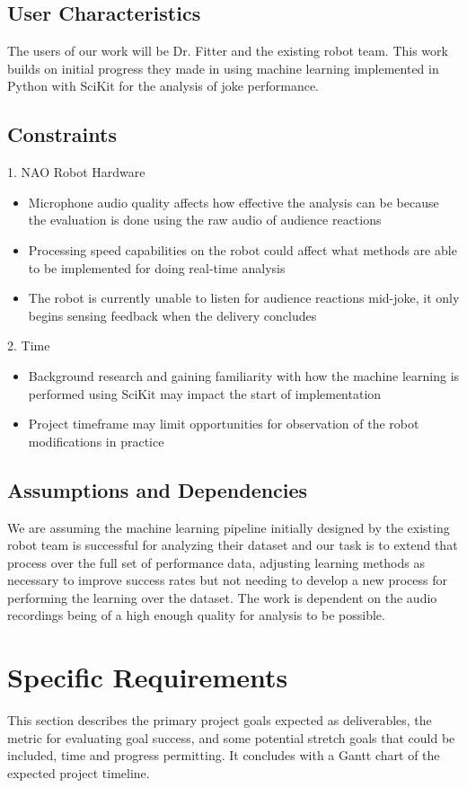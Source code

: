 \documentclass[onecolumn, draftclsnofoot,10pt, compsoc]{IEEEtran}
\begin{document}
\subsection{User Characteristics}
The users of our work will be Dr. Fitter and the existing robot team. This work builds on initial progress they made in using machine learning implemented in Python with SciKit for the analysis of joke performance.
\subsection{Constraints}
1. NAO Robot Hardware
\begin{itemize}	
\item Microphone audio quality affects how effective the analysis can be because the evaluation is done using the raw audio of audience reactions
\item Processing speed capabilities on the robot could affect what methods are able to be implemented for doing real-time analysis
\item The robot is currently unable to listen for audience reactions mid-joke, it only begins sensing feedback when the delivery concludes
\end{itemize}
2. Time
\begin{itemize}	
\item Background research and gaining familiarity with how the machine learning is performed using SciKit may impact the start of implementation
\item Project timeframe may limit opportunities for observation of the robot modifications in practice
\end{itemize}
\subsection{Assumptions and Dependencies}
We are assuming the machine learning pipeline initially designed by the existing robot team is successful for analyzing their dataset and our task is to extend that process over the full set of performance data, adjusting learning methods as necessary to improve success rates but not needing to develop a new process for performing the learning over the dataset. The work is dependent on the audio recordings being of a high enough quality for analysis to be possible.

\section{Specific Requirements}
This section describes the primary project goals expected as deliverables, the metric for evaluating goal success, and some potential stretch goals that could be included, time and progress permitting. It concludes with a Gantt chart of the expected project timeline.
\end{document}
